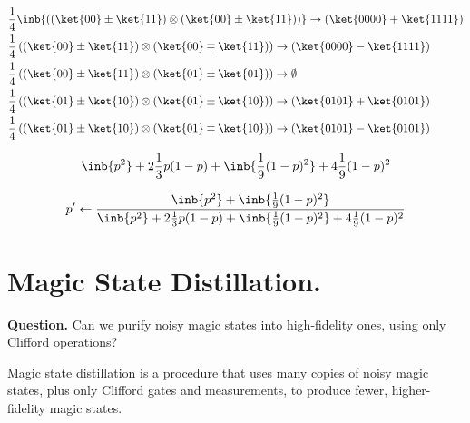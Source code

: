\documentclass[12pt,a4paper]{article}
\begin{document}
\begin{equation*}
  \begin{split}
    & \frac{1}{4} \inb{ \left(  \left(\ket{00} \pm \ket{11} \right) \otimes \left(\ket{00} \pm \ket{11} \right) \right) }  \rightarrow \left( \ket{0000} + \ket{1111} \right)  \\ 
    & \frac{1}{4}  \left(  \left(\ket{00} \pm \ket{11} \right) \otimes \left(\ket{00} \mp \ket{11} \right) \right)  \rightarrow \left( \ket{0000} - \ket{1111} \right)  \\ 
    & \frac{1}{4}  \left(  \left(\ket{00} \pm \ket{11} \right) \otimes \left(\ket{01} \pm \ket{01} \right) \right)  \rightarrow \emptyset  \\ 
    & \frac{1}{4}  \left(  \left(\ket{01} \pm \ket{10} \right) \otimes \left(\ket{01} \pm \ket{10} \right) \right)  \rightarrow \left( \ket{0101} + \ket{0101} \right)  \\ 
    & \frac{1}{4}  \left(  \left(\ket{01} \pm \ket{10} \right) \otimes \left(\ket{01} \mp \ket{10} \right) \right)  \rightarrow \left( \ket{0101} - \ket{0101} \right)  
  \end{split}
\end{equation*}


\begin{equation*}
  \begin{split}
    \inb{p^2} + 2\frac{1}{3} p(1-p)+ \inb{\frac{1}{9}(1-p)^2} + 4\frac{1}{9}(1-p)^2 
  \end{split}
\end{equation*}


\begin{equation*}
  \begin{split}
    p^\prime \leftarrow \frac{ \inb{p^2} + \inb{\frac{1}{9}(1-p)^2} }{ \inb{p^2} + 2\frac{1}{3} p(1-p)+\inb{ \frac{1}{9}(1-p)^2} + 4\frac{1}{9}(1-p)^2  }
  \end{split}
\end{equation*}





\section{Magic State Distillation.}

\textbf{Question.} Can we purify noisy magic states into high-fidelity ones, using only Clifford operations?

Magic state distillation is a procedure that uses many copies of noisy magic states, plus only Clifford gates and measurements, to produce fewer, higher-fidelity magic states.
\end{document}
